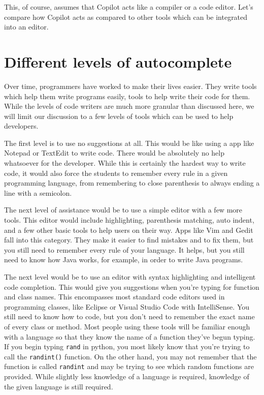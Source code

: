 \documentclass[12pt]{article}
\begin{document}
This, of course, assumes that Copilot acts like a compiler or a code
editor. Let's compare how Copilot acts as compared to other tools which
can be integrated into an editor.

\hypertarget{different-levels-of-autocomplete}{%
\section{Different levels of
autocomplete}\label{different-levels-of-autocomplete}}

Over time, programmers have worked to make their lives easier. They
write tools which help them write programs easily, tools to help write
their code for them. While the levels of code writers are much more
granular than discussed here, we will limit our discussion to a few
levels of tools which can be used to help developers.

The first level is to use no suggestions at all. This would be like
using a app like Notepad or TextEdit to write code. There would be
absolutely no help whatsoever for the developer. While this is certainly
the hardest way to write code, it would also force the students to
remember every rule in a given programming language, from remembering to
close parenthesis to always ending a line with a semicolon.

The next level of assistance would be to use a simple editor with a few
more tools. This editor would include highlighting, parenthesis
matching, auto indent, and a few other basic tools to help users on
their way. Apps like Vim and Gedit fall into this category. They make it
easier to find mistakes and to fix them, but you still need to remember
every rule of your language. It helps, but you still need to know how
Java works, for example, in order to write Java programs.

The next level would be to use an editor with syntax highlighting and
intelligent code completion. This would give you suggestions when you're
typing for function and class names. This encompasses most standard code
editors used in programming classes, like Eclipse or Visual Studio Code
with IntelliSense. You still need to know how to code, but you don't
need to remember the exact name of every class or method. Most people
using these tools will be familiar enough with a language so that they
know the name of a function they've begun typing. If you begin typing
\texttt{rand} in python, you most likely know that you're trying to call
the \texttt{randint()} function. On the other hand, you may not remember
that the function is called \texttt{randint} and may be trying to see
which random functions are provided. While slightly less knowledge of a
language is required, knowledge of the given language is still required.
\end{document}
